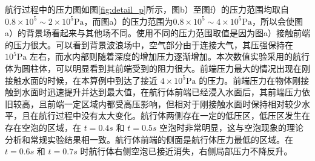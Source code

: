 航行过程中的压力图如图\ref{fig:detail_p}所示，图b）至图f）的压力范围均取自 $0.8 \times 10^5 \sim 2 \times 10^5 \mathrm{Pa}$，而图a）的压力范围为$0.8 \times 10^5 \sim 4 \times 10^5 \mathrm{Pa}$，所以会使图a）的背景场看起来与其他场不同。使用不同的压力范围取值是因为图a）接触前端的压力很大。可以看到背景波浪场中，空气部分由于连接大气，其压强保持在 $10^5 \mathrm{Pa}$ 左右，而水内部则随着深度的增加压力逐渐增加。本次数值实验采用的航行体为圆柱体，可以明显看到其前端受到的阻力很大。前端压力最大的情况出现在刚接触水面的时候，在本算例中到达了接近 $4 \times 10^5 \mathrm{Pa}$ 的压力。前端压力在物体刚接触到水面时迅速提升并达到最大值，在航行体前端已经浸入水面后，其前端压力依旧较高，且前端一定区域内都受高压影响，但相对于刚接触水面时保持相对较少水平，且在航行过程中没有太大变化。航行体两侧存在一定的低压区，低压区发生在存在空泡的区域，在 $t = 0.4s$ 和 $t = 0.5s$ 空泡时非常明显，这与空泡现象的理论分析和常规实验结果相一致。航行体前端的侧面是航行体压力最低的区域。在 $t= 0.6s$ 和 $t = 0.7s$ 时航行体右侧空泡已接近消失，右侧局部压力不降反升。

